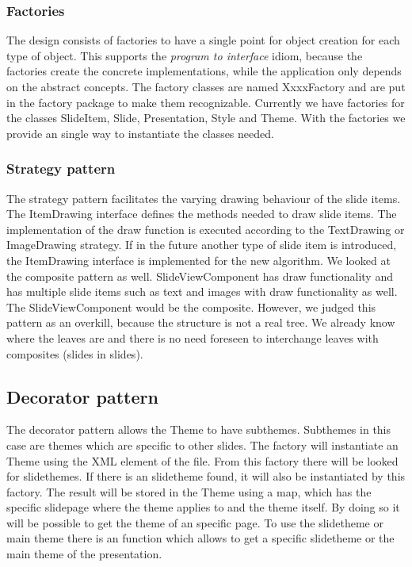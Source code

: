 \documentclass[a4paper]{article}
\begin{document}
\subsubsection{Factories}
The design consists of factories to have a single point for object creation for each type of object. This supports the \textit{program to interface} idiom, because the factories create the concrete implementations, while the application only depends on the abstract concepts. The factory classes are named XxxxFactory and are put in the factory package to make them recognizable.
Currently we have factories for the classes SlideItem, Slide, Presentation, Style and Theme. With the factories we provide an single way to instantiate the classes needed.

\subsubsection{Strategy pattern}
The strategy pattern facilitates the varying drawing behaviour of the slide items. The ItemDrawing interface defines the methods needed to draw slide items. The implementation of the draw function is executed according to the TextDrawing or ImageDrawing strategy. If  in the future another type of slide item is introduced, the ItemDrawing interface is implemented for the new algorithm. We looked at the composite pattern as well. SlideViewComponent has draw functionality and has multiple slide items such as text and images with draw functionality as well. The SlideViewComponent would be the composite. However, we judged this pattern as an overkill, because the structure is not a real tree. We already know where the leaves are and there is no need foreseen to interchange leaves with composites (slides in slides).

\subsection{Decorator pattern}
The decorator pattern allows the Theme to have subthemes. Subthemes in this case are themes which are specific to other slides. The factory will instantiate an Theme using the XML element of the file. From this factory there will be looked for slidethemes. If there is an slidetheme found, it will also be instantiated by this factory. The result will be stored in the Theme using a map, which has the specific slidepage where the theme applies to and the theme itself. By doing so it will be possible to get the theme of an specific page. To use the slidetheme or main theme there is an function which allows to get a specific slidetheme or the main theme of the presentation.
\end{document}
